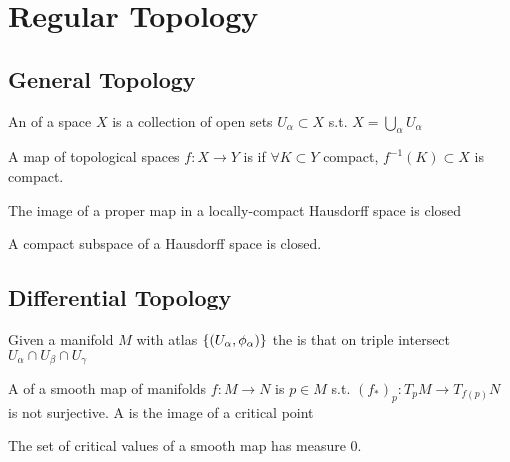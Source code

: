 \documentclass{article}
\begin{document}
\section{Regular Topology} 
\subsection{General Topology}

\begin{definition}
	An  of a space $X$ is a collection of open sets $U_\alpha \subset X$ s.t. $X = \bigcup_\alpha U_\alpha$
\end{definition}

\begin{definition}
	A map of topological spaces $f:X \to Y$ is  if $\forall K \subset Y$ compact, $f^{-1}(K)\subset X$ is compact. 
\end{definition}

\begin{prop}
	The image of a proper map in a locally-compact Hausdorff space is closed
\end{prop}

\begin{prop}
	A compact subspace of a Hausdorff space is closed. 
\end{prop}

\subsection{Differential Topology}

\begin{definition}
	Given a manifold $M$ with atlas $\left\{ (U_\alpha,\phi_\alpha) \right\}$ the  is that on triple intersect $U_\alpha \cap U_\beta \cap U_\gamma$
\end{definition}

\begin{definition}
	A  of a smooth map of manifolds $f:M\to N$ is $p \in M$ s.t. $(f_\ast)_p:T_pM \to T_{f(p)}N$ is not surjective. A  is the image of a critical point
\end{definition}

\begin{theorem}[Sard]
	The set of critical values of a smooth map has measure 0.
\end{theorem}
\end{document}
